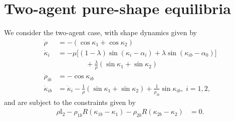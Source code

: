 \section{Two-agent pure-shape equilibria}
We consider the two-agent case, with shape dynamics given by
\begin{align}
\label{CL_dynamics_2_simplified}
\dot{\rho}
&= 
- (\cos\kappa_1 + \cos\kappa_2)
\nonumber \\
\dot{\kappa}_i 
&= 
- \mu \Big[(1 - \lambda)\sin(\kappa_i - \alpha_i) + \lambda \sin(\kappa_{ib} - \alpha_0) \Big] \nonumber \\
&\qquad  \qquad + \frac{\lambda}{\rho}(\sin\kappa_1 + \sin\kappa_2)
\\
\dot{\rho}_{ib} 
&= 
- \cos\kappa_{ib}
\nonumber \\
\dot{\kappa}_{ib} 
&= 
\dot{\kappa}_i
- \frac{1}{\rho}(\sin\kappa_1 + \sin\kappa_2)
+ \frac{1}{\rho_{ib}} \sin\kappa_{ib},  \; i=1,2,
\nonumber
\end{align}
and are subject to the constraints given by
\begin{align}
\rho \mathds{I}_2 - \rho_{1b} R(\kappa_{1b} - \kappa_1) - \rho_{2b} R(\kappa_{2b} - \kappa_{2}) &= 0. 
\label{2_agent_CoNsTrAiNt_simplified}
\end{align}
  